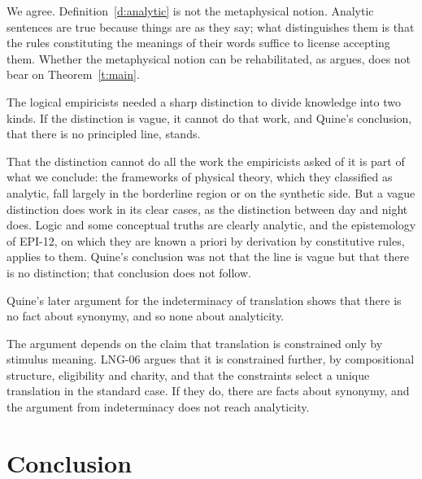 \documentclass{situationist-preprint}
\begin{document}
\begin{reply}
We agree. Definition~\ref{d:analytic} is not the metaphysical notion. Analytic sentences are true because things are as they say; what distinguishes them is that the rules constituting the meanings of their words suffice to license accepting them. Whether the metaphysical notion can be rehabilitated, as \citet{Russell2008} argues, does not bear on Theorem~\ref{t:main}.
\end{reply}

\begin{objection}
The logical empiricists needed a sharp distinction to divide knowledge into two kinds. If the distinction is vague, it cannot do that work, and Quine's conclusion, that there is no principled line, stands.
\end{objection}

\begin{reply}
That the distinction cannot do all the work the empiricists asked of it is part of what we conclude: the frameworks of physical theory, which they classified as analytic, fall largely in the borderline region or on the synthetic side. But a vague distinction does work in its clear cases, as the distinction between day and night does. Logic and some conceptual truths are clearly analytic, and the epistemology of EPI-12, on which they are known a priori by derivation by constitutive rules, applies to them. Quine's conclusion was not that the line is vague but that there is no distinction; that conclusion does not follow.
\end{reply}

\begin{objection}[Indeterminacy]
Quine's later argument for the indeterminacy of translation shows that there is no fact about synonymy, and so none about analyticity.
\end{objection}

\begin{reply}
The argument depends on the claim that translation is constrained only by stimulus meaning. LNG-06 argues that it is constrained further, by compositional structure, eligibility and charity, and that the constraints select a unique translation in the standard case. If they do, there are facts about synonymy, and the argument from indeterminacy does not reach analyticity.
\end{reply}

\section{Conclusion}
\end{document}
